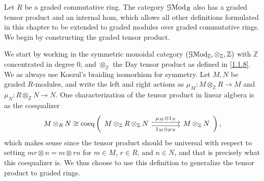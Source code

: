 \begin{construction}\label{1.4.14}
	Let $R$ be a graded commutative ring. The category $\mathcal{G} \mathcal{M}\mathrm{od}_R$ also has a graded tensor product and an internal hom, which allows all other definitions formulated in this chapter to be extended to graded modules over graded commutative rings. We begin by constructing the graded tensor product.
	
	We start by working in the symmetric monoidal category $(\mathcal{G} \mathcal{M}\mathrm{od} _\mathbb{Z} ,\otimes _\mathbb{Z} ,\mathbb{Z} )$ with $\mathbb{Z} $ concentrated in degree 0, and $\otimes _\mathbb{Z} $ the Day tensor product as defined in \cref{1.1.8}. We as always use Koszul's braiding isomorhism for symmetry. Let $M,N$ be graded $R$-modules, and write the left and right actions as $\mu_M : M\otimes _\mathbb{Z} R \to M$ and $\mu _N : R\otimes _\mathbb{Z} N \to N$. One characterization of the tensor product in linear algbera is as the coequalizer
	\[
		M\otimes _RN \cong \operatorname{coeq}\left( 
			\begin{tikzcd}[column sep=4em]
				M\otimes _\mathbb{Z} R\otimes _\mathbb{Z} N \ar[" \mu_M \otimes 1_N ", shift left, r] \ar[" 1_M\otimes \mu _N "', shift right, r] & M\otimes _\mathbb{Z} N
			\end{tikzcd}
		\right) ,
	\]
	which makes sense since the tensor product should be universal with respect to setting $mr\otimes n = m\otimes rn$ for $m\in M$, $r\in R$, and $n\in N$, and that is precisely what this coequalizer is. We thus choose to use this definition to generalize the tensor product to graded rings.


\end{construction}
